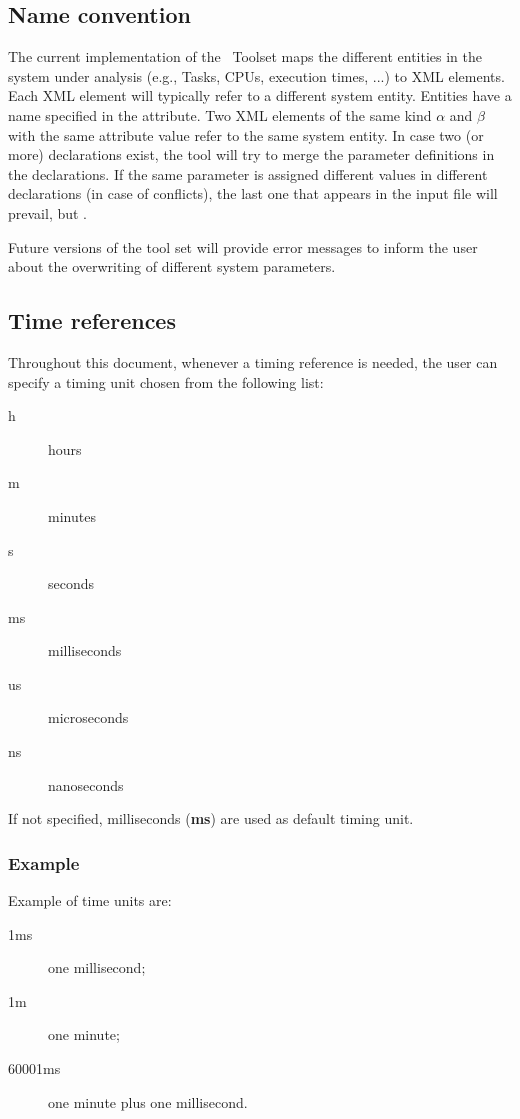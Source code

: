 \subsection{Name convention}

The current implementation of the \rtd\ Toolset maps the different
entities in the system under analysis (e.g., Tasks, CPUs, execution
times, ...) to XML elements. Each XML element will typically
refer to a different system entity. Entities have a name specified in
the  attribute. Two XML elements of the same kind $\alpha$
and $\beta$ with the same  attribute value refer to the
same system entity. In case two (or more) declarations exist, the tool
will try to merge the parameter definitions in the declarations.  If
the same parameter is assigned different values in different
declarations (in case of conflicts), the last one that appears in the
input file will prevail, but .

Future versions of the tool set will provide error messages to inform
the user about the overwriting of different system parameters.


\subsection{Time references}

Throughout this document, whenever a timing reference is needed, the
user can specify a timing unit chosen from the following list:

\begin{description}
\item [{h}] hours
\item [{m}] minutes
\item [{s}] seconds
\item [{ms}] milliseconds
\item [{us}] microseconds
\item [{ns}] nanoseconds
\end{description}

If not specified, milliseconds (\textbf{ms}) are used as default
timing unit.


\subsubsection{Example}

Example of time units are:
\begin{description}
\item [1ms] one millisecond;
\item [1m] one minute;
\item [60001ms] one minute plus one millisecond.
\end{description}

